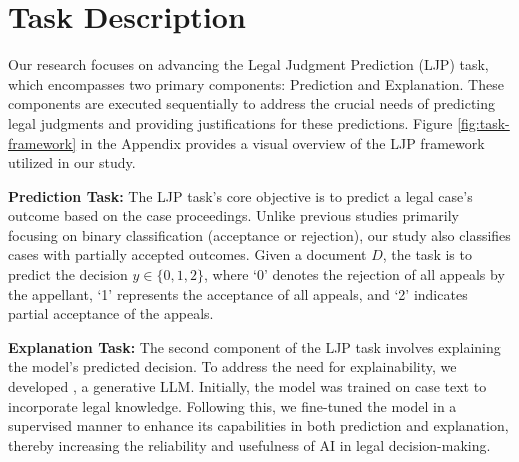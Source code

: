 \section{Task Description}
Our research focuses on advancing the Legal Judgment Prediction (LJP) task, which encompasses two primary components: Prediction and Explanation. These components are executed sequentially to address the crucial needs of predicting legal judgments and providing justifications for these predictions. Figure \ref{fig:task-framework} in the Appendix provides a visual overview of the LJP framework utilized in our study.

\noindent
%
\textbf{Prediction Task:} The LJP task's core objective is to predict a legal case's outcome based on the case proceedings. Unlike previous studies primarily focusing on binary classification (acceptance or rejection), our study also classifies cases with partially accepted outcomes. Given a document \(D\), the task is to predict the decision \(y \in \{0, 1, 2\}\), where `0' denotes the rejection of all appeals by the appellant, `1' represents the acceptance of all appeals, and `2' indicates partial acceptance of the appeals.

\noindent
%
\textbf{Explanation Task:} The second component of the LJP task involves explaining the model's predicted decision. To address the need for explainability, we developed \texttt{\namel}, a generative LLM. Initially, the model was trained on case text to incorporate legal knowledge. Following this, we fine-tuned the model in a supervised manner to enhance its capabilities in both prediction and explanation, thereby increasing the reliability and usefulness of AI in legal decision-making.
